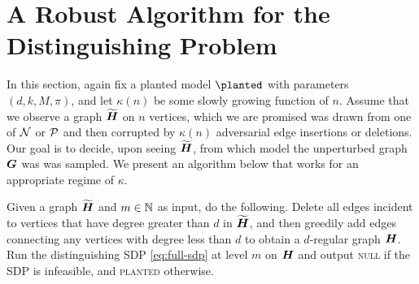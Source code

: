 \section{A Robust Algorithm for the Distinguishing Problem} \label{sec:robust}

In this section, again fix a planted model $\planted$ with parameters $(d,k,M,\pi)$, and let $\kappa(n)$ be some slowly growing function of $n$. Assume that we observe a graph $\widetilde{\boldsymbol{H}}$ on $n$ vertices, which we are promised was drawn from one of $\mathcal{N}$ or $\mathcal{P}$ and then corrupted by $\kappa(n)$ adversarial edge insertions or deletions. Our goal is to decide, upon seeing $\widetilde{\boldsymbol{H}}$, from which model the unperturbed graph $\boldsymbol{G}$ was was sampled. We present an algorithm below that works for an appropriate regime of $\kappa$. 

\begin{algorithm}	\label{alg:robust}
	Given a graph $\widetilde{\boldsymbol{H}}$ and $m \in \mathbb{N}$ as input, do the following.  Delete all edges incident to vertices that have degree greater than $d$ in $\widetilde{\boldsymbol{H}}$, and then greedily add edges connecting any vertices with degree less than $d$ to obtain a $d$-regular graph $\boldsymbol{H}$. Run the distinguishing SDP \eqref{eq:full-sdp} at level $m$ on $\boldsymbol{H}$ and output \textsc{null} if the SDP is infeasible, and \textsc{planted} otherwise.
\end{algorithm}

